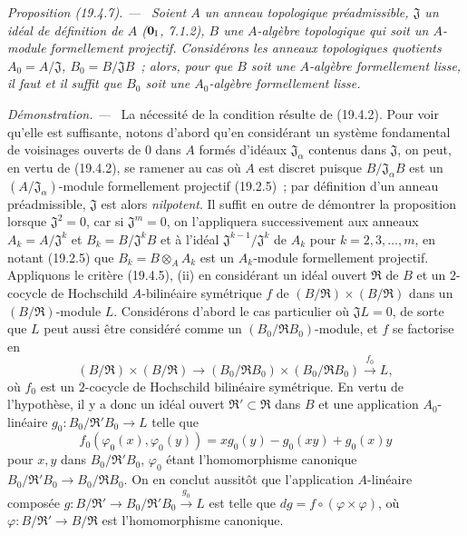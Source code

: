 \documentclass[10pt,oneside]{book}
\makeatletter
\newcommand{\setmanualcurrentlabel}[1]{\def\@currentlabel{#1}}
\newcommand{\oldpage}[2][]{%
  \setcounter{footnote}{0}%
  \marginpar{\scriptsize\textbf{#1}~|~#2}\ignorespaces}
\newenvironment{proposition}[1][]{%
  \setmanualcurrentlabel{#1}\par\medskip\noindent\itshape Proposition (#1). ---\ }{\par}
\newenvironment{proof}{%
  \par\medskip\noindent\textit{Démonstration. ---\ }}{\par}
\makeatother
\begin{document}
\begin{proposition}[19.4.7]
\label{0.19.4.7-fr}
Soient $A$ un anneau topologique préadmissible, $\mathfrak J$ un idéal de
définition de $A$ ($\mathbf 0_{\rm I}$, 7.1.2), $B$ une $A$-algèbre
topologique qui soit un $A$-module formellement projectif. Considérons les
anneaux topologiques quotients $A_0=A/\mathfrak J$,
$B_0=B/\mathfrak JB$~; alors, pour que $B$ soit une $A$-algèbre formellement
lisse, il faut et il suffit que $B_0$ soit une $A_0$-algèbre formellement
lisse.
\end{proposition}

\oldpage[0\textsubscript{IV-1}]{89}

\begin{proof}
La nécessité de la condition résulte de (19.4.2). Pour voir qu'elle est
suffisante, notons d'abord qu'en considérant un système fondamental de
voisinages ouverts de $0$ dans $A$ formés d'idéaux
$\mathfrak J_\alpha$ contenus dans $\mathfrak J$, on peut, en vertu de
(19.4.2), se ramener au cas où $A$ est discret puisque
$B/\mathfrak J_\alpha B$ est un
$(A/\mathfrak J_\alpha)$-module formellement projectif (19.2.5)~; par
définition d'un anneau préadmissible, $\mathfrak J$ est alors
\emph{nilpotent}. Il suffit en outre de démontrer la proposition lorsque
$\mathfrak J^2=0$, car si $\mathfrak J^m=0$, on l'appliquera successivement
aux anneaux $A_k=A/\mathfrak J^k$ et $B_k=B/\mathfrak J^kB$ et à l'idéal
$\mathfrak J^{k-1}/\mathfrak J^k$ de $A_k$ pour $k=2,3,\ldots,m$, en
notant (19.2.5) que $B_k=B\otimes_A A_k$ est un $A_k$-module formellement
projectif. Appliquons le critère (19.4.5), (ii) en considérant un idéal ouvert
$\mathfrak R$ de $B$ et un $2$-cocycle de Hochschild $A$-bilinéaire
symétrique $f$ de $(B/\mathfrak R)\times(B/\mathfrak R)$ dans un
$(B/\mathfrak R)$-module $L$. Considérons d'abord le cas particulier où
$\mathfrak JL=0$, de sorte que $L$ peut aussi être considéré comme un
$(B_0/\mathfrak RB_0)$-module, et $f$ se factorise en
\[
  (B/\mathfrak R)\times(B/\mathfrak R)\to
  (B_0/\mathfrak RB_0)\times(B_0/\mathfrak RB_0)
  \xrightarrow{f_0}L,
\]
où $f_0$ est un $2$-cocycle de Hochschild bilinéaire symétrique. En vertu de
l'hypothèse, il y a donc un idéal ouvert
$\mathfrak R'\subset\mathfrak R$ dans $B$ et une application
$A_0$-linéaire $g_0:B_0/\mathfrak R'B_0\to L$ telle que
\[
  f_0(\varphi_0(x),\varphi_0(y))
  =xg_0(y)-g_0(xy)+g_0(x)y
\]
pour $x,y$ dans $B_0/\mathfrak R'B_0$, $\varphi_0$ étant
l'homomorphisme canonique
$B_0/\mathfrak R'B_0\to B_0/\mathfrak RB_0$. On en conclut aussitôt que
l'application $A$-linéaire composée
$g:B/\mathfrak R'\to B_0/\mathfrak R'B_0\xrightarrow{g_0}L$ est telle
que $dg=f\circ(\varphi\times\varphi)$, où
$\varphi:B/\mathfrak R'\to B/\mathfrak R$ est l'homomorphisme
canonique.


\end{proof}
\end{document}
